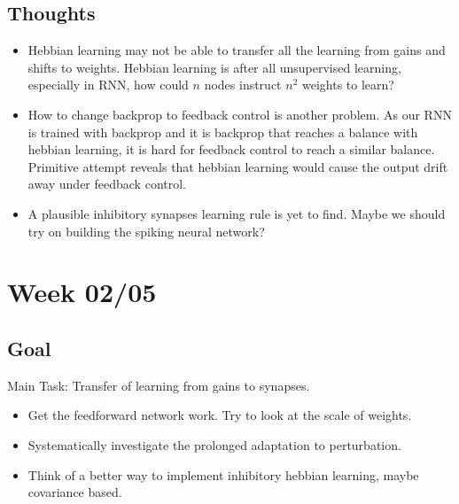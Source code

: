 \documentclass[12pt, a4paper]{article}
\begin{document}
\subsection*{Thoughts}

\begin{itemize}
    \item Hebbian learning may not be able to transfer all the learning from gains and shifts to weights. Hebbian learning is after all unsupervised learning, especially in RNN, how could $n$ nodes instruct $n^2$ weights to learn?
    \item How to change backprop to feedback control is another problem. As our RNN is trained with backprop and it is backprop that reaches a balance with hebbian learning, it is hard for feedback control to reach a similar balance. Primitive attempt reveals that hebbian learning would cause the output drift away under feedback control.
    \item A plausible inhibitory synapses learning rule is yet to find. Maybe we should try on building the spiking neural network?
\end{itemize}

\newpage


\section*{Week 02/05}

\subsection*{Goal}

\noindent
Main Task: Transfer of learning from gains to synapses.

\begin{itemize}
    \item Get the feedforward network work. Try to look at the scale of weights.
    \item Systematically investigate the prolonged adaptation to perturbation.
    \item Think of a better way to implement inhibitory hebbian learning, maybe covariance based.
\end{itemize}
\end{document}
